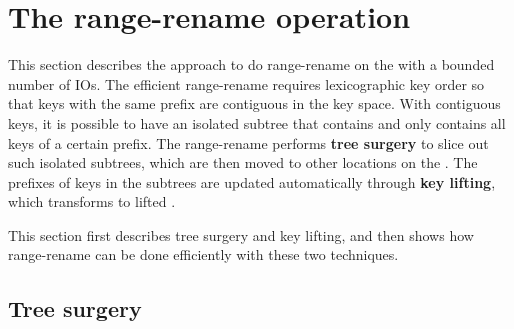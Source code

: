 \section{The range-rename operation}

This section describes the approach to do range-rename on the \bet
with a bounded number of IOs.
The efficient range-rename requires lexicographic key order so that keys with
the same prefix are contiguous in the key space.
With contiguous keys, it is possible to have an isolated subtree that contains
and only contains all keys of a certain prefix.
The range-rename performs \textbf{tree surgery} to slice out such isolated
subtrees, which are then moved to other locations on the \bet.
The prefixes of keys in the subtrees are updated automatically through
\textbf{key lifting}, which transforms \bets to lifted \bets.

This section first describes tree surgery and key lifting, and then shows how
range-rename can be done efficiently with these two techniques.

\subsection{Tree surgery}

